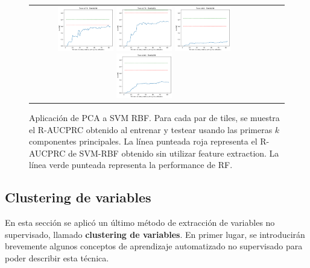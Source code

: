 \begin{figure}[h!]
\begin{tabular}{cccc}
\includegraphics[width=0.25\textwidth]{Kap5/rbf_INDIVIDUAL_CURVES_train=b278test=b234.png}  \includegraphics[width=0.25\textwidth]{Kap5/rbf_INDIVIDUAL_CURVES_train=b278test=b261.png} 
 \includegraphics[width=0.25\textwidth]{Kap5/rbf_INDIVIDUAL_CURVES_train=b360test=b234.png}  \includegraphics[width=0.25\textwidth]{Kap5/rbf_INDIVIDUAL_CURVES_train=b360test=b278.png} 
\end{tabular}
\caption{Aplicación de PCA a SVM RBF. Para cada par de tiles, se muestra el R-AUCPRC obtenido al entrenar y testear usando las primeras $k$ componentes principales. La línea punteada roja representa el R-AUCPRC de SVM-RBF obtenido sin utilizar feature extraction. La línea verde punteada representa la performance de RF.}
\label{fig:pca_k}
\end{figure}

\subsection{Clustering de variables}

En esta sección se aplicó un último método de extracción de variables no supervisado, llamado \textbf{clustering de variables}. En primer lugar, se introducirán brevemente algunos conceptos de aprendizaje automatizado no supervisado para poder describir esta técnica. \\

